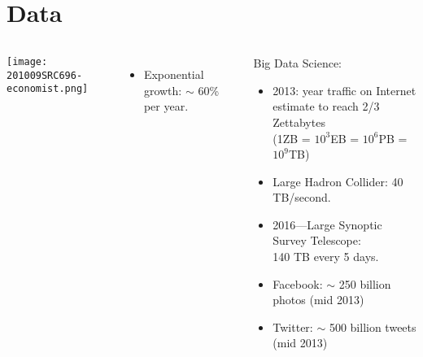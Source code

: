 \section{Data}


\begin{frame}
  
\end{frame}

\begin{frame}
  
\end{frame}

\begin{frame}


  \begin{columns}
    \texttt{[image: 201009SRC696-economist.png]}
    \begin{itemize}
    \item 
      Exponential growth: $\sim$ 60\% per year.
    \end{itemize}
    \begin{block}{Big Data Science:}
    \begin{itemize}
    \item 
      2013: year traffic on Internet estimate to reach 2/3 Zettabytes \\
      (1ZB = $10^3$EB = $10^6$PB = $10^9$TB)
    \item 
      Large Hadron Collider: 40 TB/second.\\
    \item 
      2016---Large Synoptic Survey Telescope:\\
      140 TB every 5 days.
    \item 
      Facebook: $\sim$ 250 billion photos (mid 2013)
    \item 
      Twitter: $\sim$ 500 billion tweets (mid 2013)
    \end{itemize}
    \end{block}      
  \end{columns}

\end{frame}


